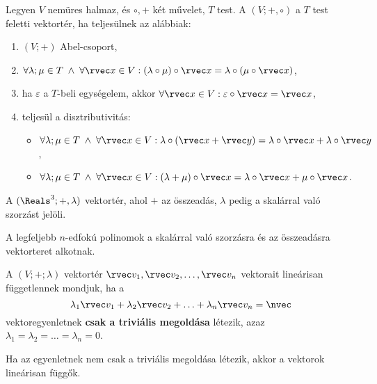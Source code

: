 \documentclass[a4paper, 12pt]{scrartcl}
\begin{document}
\begin{definition}[Vektortér]
  Legyen $V$ nemüres halmaz, és $\circ, +$ két művelet, $T$ test.
  A $(V; +, \circ)$ a $T$ test feletti vektortér, ha teljesülnek az alábbiak:
  \begin{enumerate}
    \item $(V; +)$ Abel-csoport,

    \item $\forall \lambda; \mu \in T \; \land \; \forall \rvec x \in V:
            (\lambda \circ \mu) \circ \rvec x
            = \lambda \circ (\mu \circ \rvec x)$,

    \item ha $\varepsilon$ a $T$-beli egységelem, akkor
          $\forall \rvec x \in V: \varepsilon \circ \rvec x = \rvec x$,

    \item teljesül a disztributivitás:
          \begin{itemize}
            \item $\forall \lambda; \mu \in T \; \land \; \forall \rvec x \in V:
                    \lambda \circ (\rvec x + \rvec y)
                    = \lambda \circ \rvec x + \lambda \circ \rvec y$,

            \item $\forall \lambda; \mu \in T \; \land \; \forall \rvec x \in V:
                    (\lambda + \mu) \circ \rvec x
                    = \lambda \circ \rvec x + \mu \circ \rvec x$.
          \end{itemize}
  \end{enumerate}
\end{definition}

\begin{example}
  A $(\Reals^3; +, \lambda)$ vektortér, ahol $+$ az összeadás, $\lambda$ pedig
  a skalárral való szorzást jelöli.

  A legfeljebb $n$-edfokú polinomok a skalárral való szorzásra és az összeadásra
  vektorteret alkotnak.
\end{example}

\begin{definition}
  A $(V; +; \lambda)$ vektortér $\rvec v_1, \rvec v_2, \ldots, \rvec v_n$
  vektorait lineárisan függetlennek mondjuk, ha a
  $$
    \lambda_1 \rvec v_1
    + \lambda_2 \rvec v_2
    + \ldots
    + \lambda_n \rvec v_n
    = \nvec
  $$
  vektoregyenletnek \textbf{csak a triviális megoldása} létezik, azaz
  $\lambda_1 = \lambda_2 = \ldots = \lambda_n = 0$.

  Ha az egyenletnek nem csak a triviális megoldása létezik, akkor a vektorok
  lineárisan függők.
\end{definition}
\end{document}
